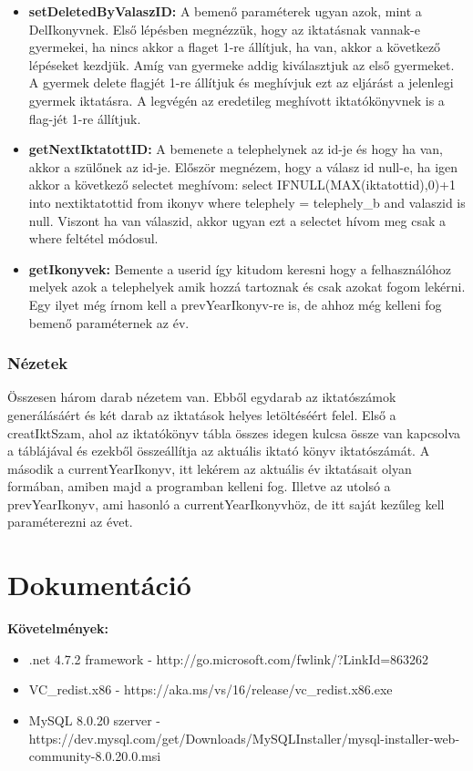 \documentclass[
]{thesis-ekf}
\theoremstyle{definition}
\theoremstyle{remark}
\begin{document}
\begin{itemize}[leftmargin=0pt]
	\item[] \textbf{setDeletedByValaszID: }A bemenő paraméterek ugyan azok, mint a DelIkonyvnek. Első lépésben megnézzük, hogy az iktatásnak vannak-e gyermekei, ha nincs akkor a flaget 1-re állítjuk, ha van, akkor a következő lépéseket kezdjük. Amíg van gyermeke addig kiválasztjuk az első gyermeket. A gyermek delete flagjét 1-re állítjuk és meghívjuk ezt az eljárást a jelenlegi gyermek iktatásra. A legvégén az eredetileg meghívott iktatókönyvnek is a flag-jét 1-re állítjuk. 
	\item[] \textbf{getNextIktatottID: }A bemenete a telephelynek az id-je és hogy ha van, akkor a szülőnek az id-je. Először megnézem, hogy a válasz id null-e, ha igen akkor a következő selectet meghívom:  select IFNULL(MAX(iktatottid),0)+1 into nextiktatottid from ikonyv where telephely = telephely\_b and valaszid is null. Viszont ha van válaszid, akkor ugyan ezt a selectet hívom meg csak a where feltétel módosul.
	\item[] \textbf{getIkonyvek: }Bemente a userid így kitudom keresni hogy a felhasználóhoz melyek azok a telephelyek amik hozzá tartoznak és csak azokat fogom lekérni. Egy ilyet még írnom kell a prevYearIkonyv-re is, de ahhoz még kelleni fog bemenő paraméternek az év. 
\end{itemize}
\subsection{Nézetek}
Összesen három darab nézetem van. Ebből egydarab az iktatószámok generálásáért és két darab az iktatások helyes letöltéséért felel. Első a creatIktSzam, ahol az iktatókönyv tábla összes idegen kulcsa össze van kapcsolva a táblájával és ezekből összeállítja az aktuális iktató könyv iktatószámát. A második a currentYearIkonyv, itt lekérem az aktuális év iktatásait olyan formában, amiben majd a programban kelleni fog. Illetve az utolsó a prevYearIkonyv, ami hasonló a currentYearIkonyvhöz, de itt saját kezűleg kell paraméterezni az évet.
\chapter{Dokumentáció}
\textbf{Követelmények:}
\begin{itemize}
	\item .net 4.7.2 framework - http://go.microsoft.com/fwlink/?LinkId=863262
	\item VC\_redist.x86 - https://aka.ms/vs/16/release/vc\_redist.x86.exe
	\item MySQL 8.0.20 szerver - https://dev.mysql.com/get/Downloads/MySQLInstaller/mysql-installer-web-community-8.0.20.0.msi
\end{itemize}
\end{document}

